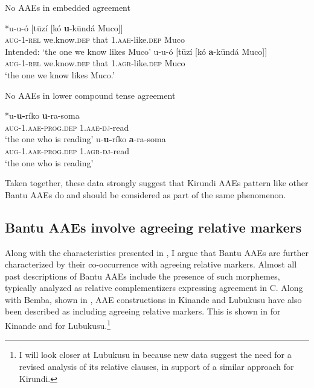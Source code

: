 \documentclass[output=paper,colorlinks,citecolor=brown
]{langscibook}
\begin{document}
\ea No AAEs in embedded agreement \label{ex:myers:embed}
\begin{xlist}
\ex \gll {}*u-u-ó [tūzí [kó {\bfseries  u}-kūndá Muco]]\\
		\textsc{aug-1-rel} we.know.\textsc{dep} that \textsc{1.aae}-like.\textsc{dep} Muco\\
			\glt {}Intended: `the one we know likes Muco'
\ex \gll {}u-u-ó [tūzí [kó {\bfseries  a}-kūndá Muco]]\\
	\textsc{aug-1-rel} we.know.\textsc{dep} that \textsc{1.agr}-like.\textsc{dep} Muco\\
			\glt {}`the one we know likes Muco.' 
			\end{xlist}
			\z
			
\ea No AAEs in lower compound tense agreement \label{ex:myers:ct}
\begin{xlist}
\ex \gll {}*u-{\bfseries  u-}ríko {\bfseries  u}-ra-soma\\
\textsc{aug}-1.\textsc{aae}-\textsc{prog.dep} 1.\textsc{aae}-\textsc{dj}-read\\
\glt {}`the one who is reading' 
\ex \gll {}u-{\bfseries  u-}ríko {\bfseries  a}-ra-soma\\
\textsc{aug}-1.\textsc{aae}-\textsc{prog.dep} 1.\textsc{agr}-\textsc{dj}-read\\
\glt {}`the one who is reading' 
\end{xlist}
\z

Taken together, these data strongly suggest that Kirundi AAEs pattern like other Bantu AAEs do and should be considered as part of the same phenomenon.

\subsection{Bantu AAEs involve agreeing relative markers} \label{sec:myers:unified}

Along with the characteristics presented in , I argue that Bantu AAEs are further characterized by their co-occurrence with agreeing relative markers. Almost all past descriptions of Bantu AAEs include the presence of such morphemes, typically analyzed as relative complementizers expressing agreement in C. Along with Bemba, shown in , AAE constructions in Kinande and Lubukusu have also been described as including agreeing relative markers. This is shown in  for Kinande and  for Lubukusu.\footnote{I will look closer at Lubukusu in  because new data suggest the need for a revised analysis of its relative clauses, in support of a similar approach for Kirundi.}
\end{document}
